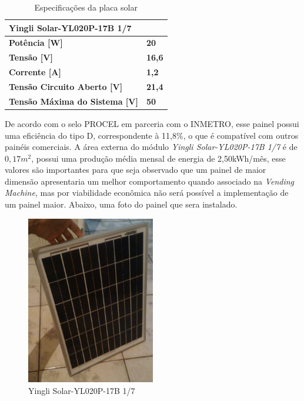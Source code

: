 \begin{table}[H]
\centering
\caption{Especificações da placa solar }
\label{my-label}
\begin{tabular}{|l|l}
\cline{1-1}
\textbf{Yingli Solar-YL020P-17B 1/7} &                                    \\ \hline
\textbf{Potência {[}W{]}}                                                           & \multicolumn{1}{l|}{\textbf{20}}   \\ \hline
\textbf{Tensão {[}V{]}}                                                             & \multicolumn{1}{l|}{\textbf{16,6}} \\ \hline
\textbf{Corrente {[}A{]}}                                                           & \multicolumn{1}{l|}{\textbf{1,2}}  \\ \hline
\textbf{Tensão Circuito Aberto {[}V{]}}                                             & \multicolumn{1}{l|}{\textbf{21,4}} \\ \hline
\textbf{Tensão Máxima do Sistema {[}V{]}}                                           & \multicolumn{1}{l|}{\textbf{50}}   \\ \hline
\end{tabular}
\end{table}

        	De acordo com o selo PROCEL em parceria com o INMETRO, esse painel possui uma eficiência do tipo D, correspondente à 11,8\%, o que é compatível com outros painéis comerciais.
            A área externa do módulo \textit{Yingli Solar-YL020P-17B 1/7} é de $0,17m^{2}$, possui uma produção média mensal de energia de 2,50kWh/mês, esse valores são importantes para que seja observado que um painel de maior dimensão apresentaria um melhor comportamento quando associado na \textit{Vending Machine}, mas por viabilidade econômica não será possível a implementação de um painel maior.
            Abaixo, uma foto do painel que sera instalado.

 \begin{figure}[H]
    \centering
    \includegraphics[width=0.5\textwidth]{figuras/painel_solar01}
    \caption{Yingli Solar-YL020P-17B 1/7 }
    \label{fig:painel_solar01}
\end{figure}
\newpage

